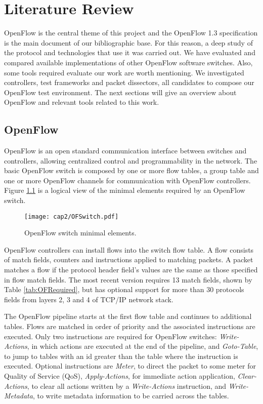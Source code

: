 \chapter{Literature Review}
\label{cap:cap02}

OpenFlow is the central theme of this project and the OpenFlow 1.3 specification \cite{ofspec13} is the main document of our bibliographic base. For this reason, a deep study of the protocol and technologies that use it was carried out. We have evaluated and compared available implementations of other OpenFlow software switches. Also, some tools required evaluate our work are worth mentioning. We investigated controllers, test frameworks and packet dissectors, all candidates to compose our OpenFlow test environment. The next sections will give an overview about OpenFlow and relevant tools related to this work. 

\section{OpenFlow}
\label{sec:sec21}

OpenFlow is an open standard communication interface between switches and controllers, allowing centralized control and programmability in the network. The basic OpenFlow switch is composed by one or more flow tables, a group table and one or more OpenFlow channels for communication with OpenFlow controllers. Figure \ref{fig:logicalswitch} is a logical view of the minimal elements required by an OpenFlow switch. 

\begin{figure}[H]
\centering
\texttt{[image: cap2/OFSwitch.pdf]}
\caption{OpenFlow switch minimal elements.}
\label{fig:logicalswitch}
\end{figure}
\pagebreak

OpenFlow controllers can install flows into the switch flow table. A flow consists of match fields, counters and instructions applied to matching packets. A packet matches a flow if the protocol header field's values are the same as those specified in flow match fields. The most recent version requires 13 match fields, shown by Table \ref{tab:OFRequired}, but has optional support for more than 30 protocols fields from layers 2, 3 and 4 of TCP/IP network stack.

The OpenFlow pipeline starts at the first flow table and continues to additional tables. Flows are matched in order of priority and the associated instructions are executed. Only two instructions are required for OpenFlow switches: \textit{Write-Actions}, in which actions are executed at the end of the pipeline, and \textit{Goto-Table}, to jump to tables with an id greater than the table where the instruction is executed. Optional instructions are \textit{Meter}, to direct the packet to some meter for Quality of Service (QoS), \textit{Apply-Actions}, for immediate action application, \textit{Clear-Actions}, to clear all actions written by a \textit{Write-Actions} instruction, and \textit{Write-Metadata}, to write metadata information to be carried across the tables. 

